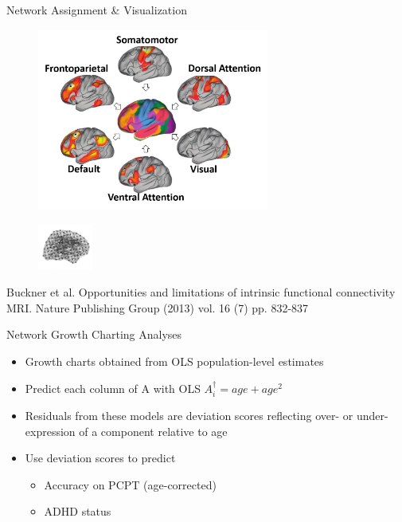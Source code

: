 \documentclass[presentation]{beamer}
\begin{document}
\begin{frame}[label={sec:orgheadline17}]{Network Assignment \& Visualization}
\begin{figure}[htb]
\centering
\includegraphics[height=6cm]{./Figures/Yeo1.png}
\end{figure}
\begin{figure}[htb]
\centering
\includegraphics[height=1.5cm]{./Figures/Yeo2.png}
\end{figure}

Buckner et al. Opportunities and limitations of intrinsic functional connectivity MRI. Nature Publishing Group (2013) vol. 16 (7) pp. 832-837
\end{frame}

\begin{frame}[label={sec:orgheadline18}]{Network Growth Charting Analyses}
\begin{itemize}
\item Growth charts obtained from OLS population-level estimates
\item Predict each column of A with OLS \(A^{\dagger}_i = age + age^2\)
\item Residuals from these models are \alert{deviation scores} reflecting over- or under- expression of a component relative to age
\item Use \alert{deviation scores} to predict
\begin{itemize}
\item Accuracy on PCPT (age-corrected)
\item ADHD status
\end{itemize}
\end{itemize}
\end{frame}
\end{document}
